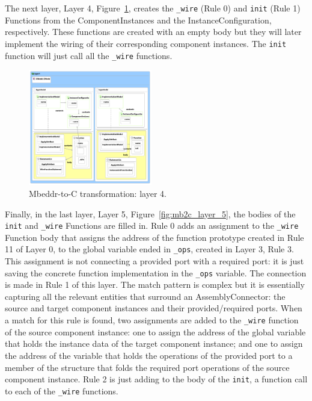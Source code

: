 The next layer, Layer 4, Figure~\ref{fig:mb2c_layer_4}, creates the \verb=_wire= (Rule 0)
and \verb=init= (Rule 1) Functions from the ComponentInstances and the InstanceConfiguration, respectively. These functions are created with an empty body but they will later implement the wiring of their corresponding component instances. The \verb=init= function will just call all the \verb=_wire= functions.

\begin{figure}
\begin{center}
  \includegraphics[width=0.48\textwidth]{figures/mbeddr2C_optimized_layer_4}
  \caption{Mbeddr-to-C transformation: layer 4.}
  \label{fig:mb2c_layer_4}
\end{center}
\end{figure}

Finally, in the last layer, Layer 5, Figure~\ref{fig:mb2c_layer_5},
the bodies of the \verb=init= and \verb=_wire= Functions are filled in.
Rule 0 adds an assignment to the \verb=_wire= Function body that assigns the address of the function prototype created in Rule 11 of Layer 0, to the global variable ended in \verb=_ops=, created in Layer 3, Rule 3.
This assignment is not connecting a provided port with a required port: it is just saving the concrete function implementation in the \verb=_ops= variable.
The connection is made in Rule 1 of this layer. The match pattern is complex but it is essentially capturing all the relevant entities that surround an AssemblyConnector: the source and target component instances and their provided/required ports. When a match for this rule is found, two assignments are added to the \verb=_wire= function of the source component instance:
one to assign the address of the global variable that holds the instance data of the target component instance; and one to assign the address of the variable that holds the operations of the provided port to a member of the structure that folds the required port operations of the source component instance.
Rule 2 is just adding to the body of the \verb=init=, a function call to each of the \verb=_wire= functions.

